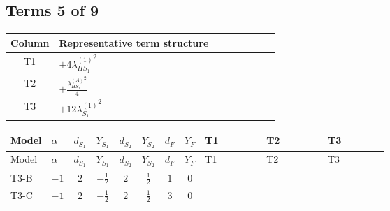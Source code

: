 \documentclass[8pt]{article}
\begin{document}
\begin{landscape}
\subsection*{Terms 5 of 9}
\begin{center}
\begin{tabular}{@{}c >{\raggedright\arraybackslash}p{0.82\linewidth}@{}}
\toprule
Column & Representative term structure \\
\midrule
T1 & \(\displaystyle +4 {\lambda_{HS_1}^{(1)}}^2\) \\
\midrule
T2 & \(\displaystyle +\frac{{\lambda_{HS_1}^{(A)}}^2}{4}\) \\
\midrule
T3 & \(\displaystyle +12 {\lambda_{S_1}^{(1)}}^2\) \\
\midrule
\bottomrule
\end{tabular}
\end{center}
\smallskip
\tiny
\begin{longtable}{@{}llcccccc >{\raggedright\arraybackslash}p{0.21\linewidth} >{\raggedright\arraybackslash}p{0.21\linewidth} >{\raggedright\arraybackslash}p{0.21\linewidth}@{}}
\toprule
Model & $\alpha$ & $d_{S_1}$ & $Y_{S_1}$ & $d_{S_2}$ & $Y_{S_2}$ & $d_F$ & $Y_F$ & T1 & T2 & T3 \\
\midrule
\endfirsthead
\toprule
Model & $\alpha$ & $d_{S_1}$ & $Y_{S_1}$ & $d_{S_2}$ & $Y_{S_2}$ & $d_F$ & $Y_F$ & T1 & T2 & T3 \\
\midrule
\endhead
T3-B & $-1$ & $2$ & $-\frac{1}{2}$ & $2$ & $\frac{1}{2}$ & $1$ & $0$ & \scriptsize\adjustbox{max width=\linewidth}{$\begin{gathered} +4 {\lambda_{HS_1}^{(1)}}^2\end{gathered}$} & \scriptsize\adjustbox{max width=\linewidth}{$\begin{gathered} +\frac{{\lambda_{HS_1}^{(A)}}^2}{4}\end{gathered}$} & \scriptsize\adjustbox{max width=\linewidth}{$\begin{gathered} +12 {\lambda_{S_1}^{(1)}}^2\end{gathered}$} \\
\midrule
T3-C & $-1$ & $2$ & $-\frac{1}{2}$ & $2$ & $\frac{1}{2}$ & $3$ & $0$ & \scriptsize\adjustbox{max width=\linewidth}{$\begin{gathered} +4 {\lambda_{HS_1}^{(1)}}^2\end{gathered}$} & \scriptsize\adjustbox{max width=\linewidth}{$\begin{gathered} +\frac{{\lambda_{HS_1}^{(A)}}^2}{4}\end{gathered}$} & \scriptsize\adjustbox{max width=\linewidth}{$\begin{gathered} +12 {\lambda_{S_1}^{(1)}}^2\end{gathered}$} \\

\end{longtable}
\end{landscape}
\end{document}
